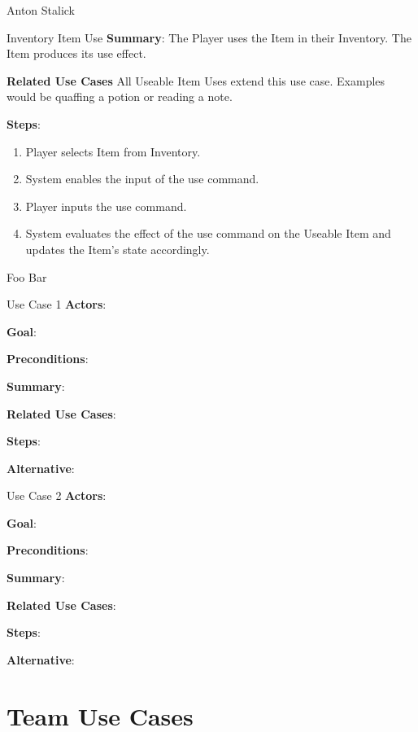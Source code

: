 \documentclass[12pt]{report}
\begin{document}
\begin{section}{Anton Stalick}
\begin{subsection}{Inventory Item Use}
\textbf{Summary}:
The Player uses the Item in their Inventory. The Item produces its
use effect.

\textbf{Related Use Cases}
All Useable Item Uses extend this use case. Examples would be quaffing
a potion or reading a note.

\textbf{Steps}:
\begin{enumerate}
\item Player selects Item from Inventory.
\item System enables the input of the use command.
\item Player inputs the use command.
\item System evaluates the effect of the use command on the
Useable Item and updates the Item's state accordingly.
\end{enumerate}

\end{subsection}
\end{section}

\begin{section}{Foo Bar}
\begin{subsection}{Use Case 1}
\textbf{Actors}:

\textbf{Goal}:

\textbf{Preconditions}:

\textbf{Summary}:

\textbf{Related Use Cases}:

\textbf{Steps}:

\textbf{Alternative}:
\end{subsection}

\begin{subsection}{Use Case 2}
\textbf{Actors}:

\textbf{Goal}:

\textbf{Preconditions}:

\textbf{Summary}:

\textbf{Related Use Cases}:

\textbf{Steps}:

\textbf{Alternative}:
\end{subsection}
\end{section}

\chapter{Team Use Cases}

\end{document}
